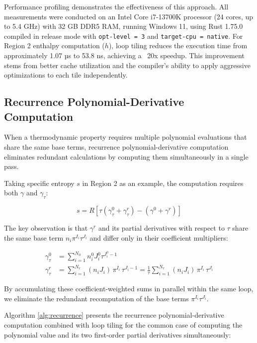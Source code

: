 \documentclass{article}
\begin{document}
Performance profiling demonstrates the effectiveness of this approach. All measurements were conducted on an Intel Core i7-13700K processor (24 cores, up to 5.4 GHz) with 32 GB DDR5 RAM, running Windows 11, using Rust 1.75.0 compiled in release mode with \texttt{opt-level = 3} and \texttt{target-cpu = native}. For Region 2 enthalpy computation ($h$), loop tiling reduces the execution time from approximately 1.07 µs to 53.8 ns, achieving a ~20x speedup. This improvement stems from better cache utilization and the compiler's ability to apply aggressive optimizations to each tile independently.

\subsection{Recurrence Polynomial-Derivative Computation}

When a thermodynamic property requires multiple polynomial evaluations that share the same base terms, recurrence polynomial-derivative computation eliminates redundant calculations by computing them simultaneously in a single pass.

Taking specific entropy $s$ in Region 2 as an example, the computation requires both $\gamma$ and $\gamma_\tau$:

\begin{equation}
s = R \left[ \tau \left( \gamma^0_\tau + \gamma^r_\tau \right) - \left( \gamma^0 + \gamma^r \right) \right]
\end{equation}

The key observation is that $\gamma^r$ and its partial derivatives with respect to $\tau$ share the same base term $n_i \pi^{I_i} \tau^{J_i}$ and differ only in their coefficient multipliers:

\begin{align}
\gamma^0_\tau &= \sum_{i=1}^{N_0} n_i^0 J_i^0 \tau^{J_i^0 - 1} \\
\gamma^r_\tau &= \sum_{i=1}^{N_r} (n_i J_i) \, \pi^{I_i} \, \tau^{J_i-1} = \frac{1}{\tau} \sum_{i=1}^{N_r} (n_i J_i) \, \pi^{I_i} \, \tau^{J_i}
\end{align}

By accumulating these coefficient-weighted sums in parallel within the same loop, we eliminate the redundant recomputation of the base terms $\pi^{I_i} \tau^{J_i}$.

Algorithm \ref{alg:recurrence} presents the recurrence polynomial-derivative computation combined with loop tiling for the common case of computing the polynomial value and its two first-order partial derivatives simultaneously:
\end{document}
